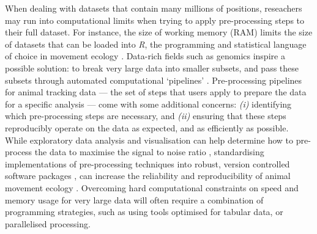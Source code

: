 \begin{refsection}
    When dealing with datasets that contain many millions of positions, reseachers may run into computational limits when trying to apply pre-processing steps to their full dataset.
    For instance, the size of working memory (RAM) limits the size of datasets that can be loaded into \textit{R}, the programming and statistical language of choice in movement ecology \cite{r2020,joo2020,joo2020b}.
    Data-rich fields such as genomics inspire a possible solution: to break very large data into smaller subsets, and pass these subsets through automated computational `pipelines' \cite{schadt2010,peng2011}.
    Pre-processing pipelines for animal tracking data --- the set of steps that users apply to prepare the data for a specific analysis --- come with some additional concerns: \textit{(i)} identifying which pre-processing steps are necessary, and \textit{(ii)} ensuring that these steps reproducibly operate on the data as expected, and as efficiently as possible.
    While exploratory data analysis and visualisation can help determine how to pre-process the data to maximise the signal to noise ratio \cite{slingsby2016}, standardising implementations of pre-processing techniques into robust, version controlled software packages \cite[e.g. in \textit{R}, see]{wickham2015}, can increase the reliability and reproducibility of animal movement ecology \cite{haddaway2015,archmiller2020,powers2019,lewis2018}.
    Overcoming hard computational constraints on speed and memory usage for very large data will often require a combination of programming strategies, such as using tools optimised for tabular data, or parallelised processing.


\end{refsection}
